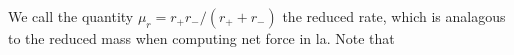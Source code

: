 We call the quantity \(\mu_r = r_+r_-/(r_+ + r_-)\) the reduced rate, which is analagous to the reduced mass when computing net force in la.  Note that